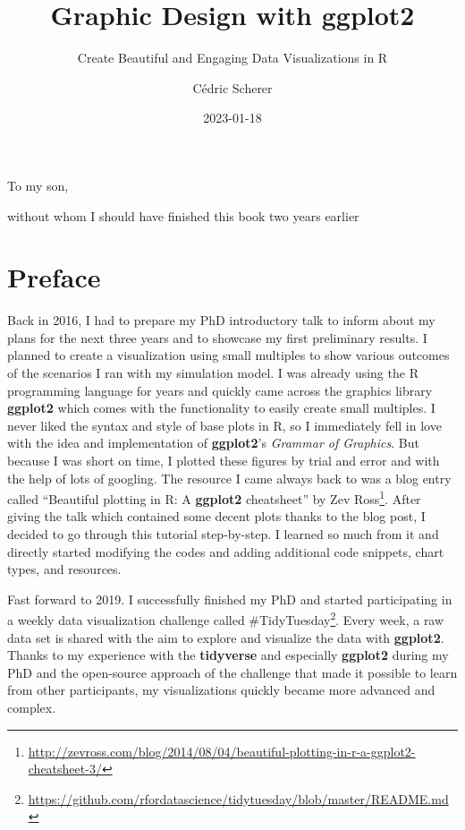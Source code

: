 \documentclass[
]{krantz}
\title{Graphic Design with ggplot2}
\subtitle{Create Beautiful and Engaging Data Visualizations in R}
\author{Cédric Scherer}
\date{2023-01-18}
\renewcommand{\href}[2]{#2\footnote{\url{#1}}}
\begin{document}
\maketitle


\thispagestyle{empty}

\begin{center}
To my son,

without whom I should have finished this book two years earlier
\end{center}

\setlength{\abovedisplayskip}{-5pt}
\setlength{\abovedisplayshortskip}{-5pt}

{
\hypersetup{linkcolor=}
\setcounter{tocdepth}{2}
\tableofcontents
}
\listoffigures
\listoftables
\hypertarget{preface}{%
\chapter*{Preface}\label{preface}}


Back in 2016, I had to prepare my PhD introductory talk to inform about my plans for the next three years and to showcase my first preliminary results. I planned to create a visualization using small multiples to show various outcomes of the scenarios I ran with my simulation model. I was already using the R programming language for years and quickly came across the graphics library \textbf{ggplot2} which comes with the functionality to easily create small multiples. I never liked the syntax and style of base plots in R, so I immediately fell in love with the idea and implementation of \textbf{ggplot2}'s \emph{Grammar of Graphics}. But because I was short on time, I plotted these figures by trial and error and with the help of lots of googling. The resource I came always back to was a blog entry called \href{http://zevross.com/blog/2014/08/04/beautiful-plotting-in-r-a-ggplot2-cheatsheet-3/}{``Beautiful plotting in R: A \textbf{ggplot2} cheatsheet'' by Zev Ross}. After giving the talk which contained some decent plots thanks to the blog post, I decided to go through this tutorial step-by-step. I learned so much from it and directly started modifying the codes and adding additional code snippets, chart types, and resources.

Fast forward to 2019. I successfully finished my PhD and started participating in a weekly data visualization challenge called \href{https://github.com/rfordatascience/tidytuesday/blob/master/README.md}{\#TidyTuesday}. Every week, a raw data set is shared with the aim to explore and visualize the data with \textbf{ggplot2}. Thanks to my experience with the \textbf{tidyverse} and especially \textbf{ggplot2} during my PhD and the open-source approach of the challenge that made it possible to learn from other participants, my visualizations quickly became more advanced and complex.
\end{document}
